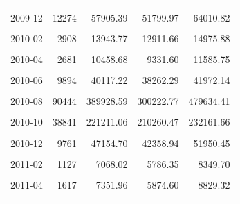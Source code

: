 \begin{longtable}[t]{crrrr}
\cellcolor{gray!10}{2009-11} & \cellcolor{gray!10}{29396} & \cellcolor{gray!10}{137829.99} & \cellcolor{gray!10}{113852.34} & \cellcolor{gray!10}{161807.63}\\
2009-12 & 12274 & 57905.39 & 51799.97 & 64010.82\\
\cellcolor{gray!10}{2010-01} & \cellcolor{gray!10}{3683} & \cellcolor{gray!10}{19318.57} & \cellcolor{gray!10}{16865.58} & \cellcolor{gray!10}{21771.57}\\
2010-02 & 2908 & 13943.77 & 12911.66 & 14975.88\\
\cellcolor{gray!10}{2010-03} & \cellcolor{gray!10}{2863} & \cellcolor{gray!10}{11682.06} & \cellcolor{gray!10}{10563.47} & \cellcolor{gray!10}{12800.65}\\
2010-04 & 2681 & 10458.68 & 9331.60 & 11585.75\\
\cellcolor{gray!10}{2010-05} & \cellcolor{gray!10}{4196} & \cellcolor{gray!10}{16835.15} & \cellcolor{gray!10}{15783.80} & \cellcolor{gray!10}{17886.50}\\
2010-06 & 9894 & 40117.22 & 38262.29 & 41972.14\\
\cellcolor{gray!10}{2010-07} & \cellcolor{gray!10}{21030} & \cellcolor{gray!10}{69334.08} & \cellcolor{gray!10}{51288.17} & \cellcolor{gray!10}{87380.00}\\
2010-08 & 90444 & 389928.59 & 300222.77 & 479634.41\\
\cellcolor{gray!10}{2010-09} & \cellcolor{gray!10}{109030} & \cellcolor{gray!10}{513195.57} & \cellcolor{gray!10}{462951.73} & \cellcolor{gray!10}{563439.41}\\
2010-10 & 38841 & 221211.06 & 210260.47 & 232161.66\\
\cellcolor{gray!10}{2010-11} & \cellcolor{gray!10}{24052} & \cellcolor{gray!10}{113697.52} & \cellcolor{gray!10}{98986.31} & \cellcolor{gray!10}{128408.73}\\
2010-12 & 9761 & 47154.70 & 42358.94 & 51950.45\\
\cellcolor{gray!10}{2011-01} & \cellcolor{gray!10}{1888} & \cellcolor{gray!10}{10899.37} & \cellcolor{gray!10}{7103.28} & \cellcolor{gray!10}{14695.47}\\
2011-02 & 1127 & 7068.02 & 5786.35 & 8349.70\\
\cellcolor{gray!10}{2011-03} & \cellcolor{gray!10}{1265} & \cellcolor{gray!10}{6323.56} & \cellcolor{gray!10}{4416.86} & \cellcolor{gray!10}{8230.26}\\
2011-04 & 1617 & 7351.96 & 5874.60 & 8829.32\\
\cellcolor{gray!10}{2011-05} & \cellcolor{gray!10}{2625} & \cellcolor{gray!10}{11534.61} & \cellcolor{gray!10}{10056.26} & \cellcolor{gray!10}{13012.96}\\

\end{longtable}

